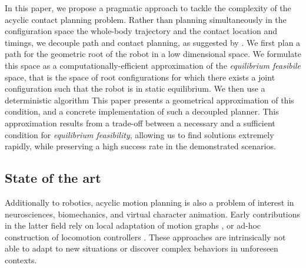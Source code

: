 In this paper, we propose a pragmatic approach to tackle the complexity of the acyclic contact planning problem. Rather than planning simultaneously in the configuration space the 
whole-body trajectory and the contact location and timings, we decouple path and contact planning, as suggested by \citeauthor{Bouyarmane2009}.
We first plan a path for the geometric root of the robot in a low dimensional space. We formulate this space as a computationally-efficient approximation
of the \textit{equilibrium feasibile} space, that is the space of root configurations for which there exists a joint configuration such that the robot is in static equilibrium.
We then use a deterministic algorithm 
This paper presents a geometrical approximation of this condition, and a concrete implementation of such a decoupled planner.
This approximation results from a trade-off between a necessary and a sufficient condition for \textit{equilibrium feasibility}, allowing us to find solutions extremely rapidly, while preserving a high success rate in the demonstrated scenarios.


\subsection{State of the art}

\newcommand{\Pa}{$\mathcal{P}_1$ }
\newcommand{\Pb}{$\mathcal{P}_2$ }

Additionally to robotics, acyclic motion planning is also a problem of interest in neurosciences, biomechanics, and virtual character animation.
Early contributions in the latter field rely on local adaptation of motion graphs \citep{citeulike:220163}, or ad-hoc construction of locomotion controllers \citep{Pettre:2003:LPD:846276.846313}. These approaches are intrinsically not able to adapt to new situations or discover complex behaviors in unforeseen contexts.

